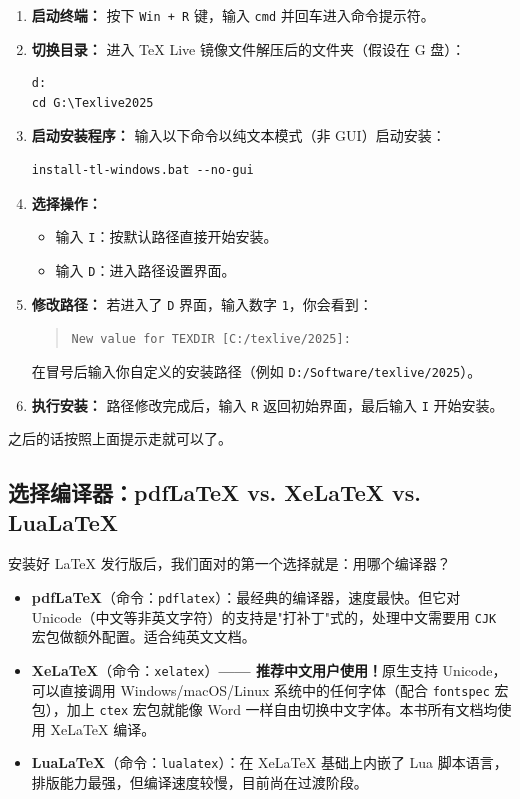 \begin{enumerate}
    \item \textbf{启动终端：} 按下 \texttt{Win + R} 键，输入 \texttt{cmd} 并回车进入命令提示符。
    
    \item \textbf{切换目录：} 进入 TeX Live 镜像文件解压后的文件夹（假设在 G 盘）：
    \begin{lstlisting}
d:
cd G:\Texlive2025
    \end{lstlisting}
    
    \item \textbf{启动安装程序：} 输入以下命令以纯文本模式（非 GUI）启动安装：
    \begin{lstlisting}
install-tl-windows.bat --no-gui
    \end{lstlisting}
    
    \item \textbf{选择操作：} 
    \begin{itemize}
        \item 输入 \texttt{I}：按默认路径直接开始安装。
        \item 输入 \texttt{D}：进入路径设置界面。
    \end{itemize}

    \item \textbf{修改路径：} 若进入了 \texttt{D} 界面，输入数字 \texttt{1}，你会看到：
    \begin{quote}
        \texttt{New value for TEXDIR [C:/texlive/2025]:}
    \end{quote}
    在冒号后输入你自定义的安装路径（例如 \texttt{D:/Software/texlive/2025}）。

    \item \textbf{执行安装：} 路径修改完成后，输入 \texttt{R} 返回初始界面，最后输入 \texttt{I} 开始安装。
\end{enumerate}
之后的话按照上面提示走就可以了。

\subsection{选择编译器：pdfLaTeX vs. XeLaTeX vs. LuaLaTeX}
安装好 \LaTeX{} 发行版后，我们面对的第一个选择就是：用哪个编译器？

\begin{itemize}
    \item \textbf{pdfLaTeX}（命令：\texttt{pdflatex}）：最经典的编译器，速度最快。但它对 Unicode（中文等非英文字符）的支持是"打补丁"式的，处理中文需要用 \texttt{CJK} 宏包做额外配置。适合纯英文文档。
    
    \item \textbf{XeLaTeX}（命令：\texttt{xelatex}）\textbf{—— 推荐中文用户使用！}原生支持 Unicode，可以直接调用 Windows/macOS/Linux 系统中的任何字体（配合 \texttt{fontspec} 宏包），加上 \texttt{ctex} 宏包就能像 Word 一样自由切换中文字体。本书所有文档均使用 XeLaTeX 编译。
    
    \item \textbf{LuaLaTeX}（命令：\texttt{lualatex}）：在 XeLaTeX 基础上内嵌了 Lua 脚本语言，排版能力最强，但编译速度较慢，目前尚在过渡阶段。
\end{itemize}

